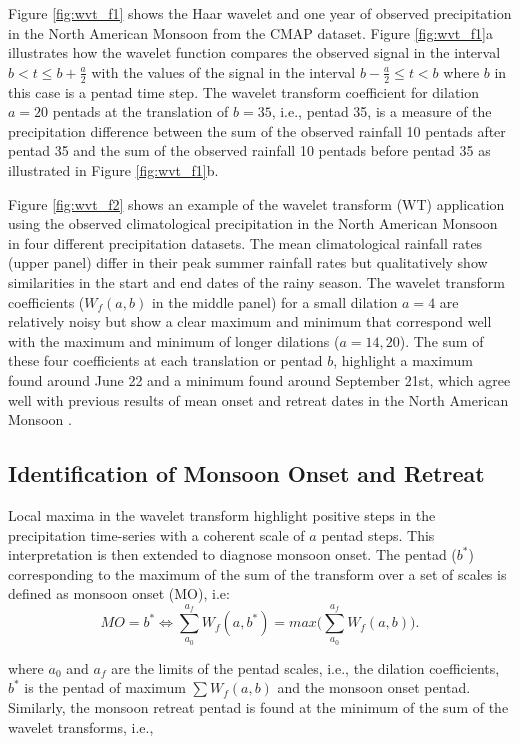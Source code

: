 Figure \ref{fig:wvt_f1} shows the Haar wavelet and one year of observed precipitation in the North American Monsoon from the CMAP dataset. Figure \ref{fig:wvt_f1}a illustrates how the wavelet function compares the observed signal in the interval $ b < t \leq b+\frac{a}{2}$ with the values of the signal in the interval $b-\frac{a}{2} \leq t < b$ where $b$ in this case is a pentad time step. The wavelet transform coefficient for dilation $a=20$ pentads at the translation of $b=35$, i.e., pentad 35, is a measure of the precipitation difference between the sum of the observed rainfall 10 pentads after pentad 35 and the sum of the observed rainfall 10 pentads before pentad 35 as illustrated in Figure \ref{fig:wvt_f1}b.


Figure \ref{fig:wvt_f2} shows an example of the wavelet transform (WT) application using the observed climatological precipitation in the North American Monsoon in four different precipitation datasets.
The mean climatological rainfall rates (upper panel) differ in their peak summer rainfall rates but qualitatively show similarities in the start and end dates of the rainy season. 
The wavelet transform coefficients ($W_f(a,b)$ in the middle panel) for a small dilation $a=4$ are relatively noisy but show a clear maximum and minimum that correspond well with the maximum and minimum of longer dilations ($a=14,20$). The sum of these four coefficients at each translation or pentad $b$, highlight a maximum found around June 22 and a minimum found around September 21st, which agree well with previous results of mean onset and retreat dates in the North American Monsoon  \citep[e.g.][]{arias2012,geil2013}.


\subsection{Identification of Monsoon Onset and Retreat}

Local maxima in the wavelet transform highlight positive steps in the precipitation time-series with a coherent scale of $a$ pentad steps. This interpretation is then extended to diagnose monsoon onset. 
 The pentad ($b^*$) corresponding to the maximum of the sum of the transform over a set of scales is defined as monsoon onset (MO), i.e: 
\begin{equation}
MO=b^* \Leftrightarrow \sum_{a_0}^{a_f} W_f(a,b^*)=max\bigg(\sum_{a_0}^{a_f} W_f(a,b)\bigg).
\label{eq:mo}
\end{equation}

\noindent where $a_0$ and $a_f$ are the limits of the pentad scales, i.e., the dilation coefficients, $b^*$ is the pentad of maximum $\sum W_f(a,b)$ and the monsoon onset pentad.
Similarly, the monsoon retreat pentad is found at the minimum of the sum of the wavelet transforms, i.e.,

